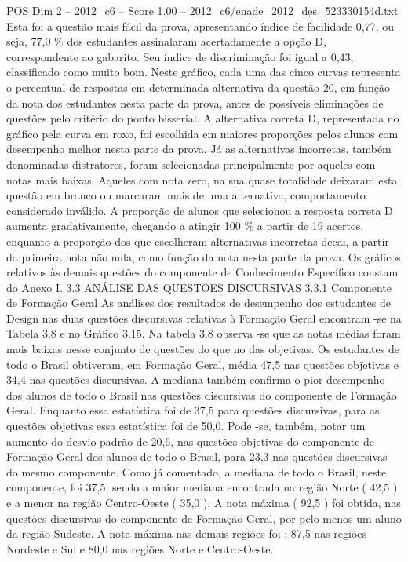 \begin{textsample}{POS Dim 2 – 2012\_c6 – Score 1.00 – 2012\_c6/enade\_2012\_des\_523330154d.txt}
Esta foi a questão mais fácil da prova, apresentando índice de facilidade 0,77, ou seja, 77,0 \% dos estudantes assinalaram acertadamente a opção D, correspondente ao gabarito.
Seu índice de discriminação foi igual a 0,43, classificado como muito bom.
Neste gráfico, cada uma das cinco curvas representa o percentual de respostas em determinada alternativa da questão 20, em função da nota dos estudantes nesta parte da prova, antes de possíveis eliminações de questões pelo critério do ponto bisserial.
A alternativa correta D, representada no gráfico pela curva em roxo, foi escolhida em maiores proporções pelos alunos com desempenho melhor nesta parte da prova.
Já as alternativas incorretas, também denominadas distratores, foram selecionadas principalmente por aqueles com notas mais baixas.
Aqueles com nota zero, na sua quase totalidade deixaram esta questão em branco ou marcaram mais de uma alternativa, comportamento considerado inválido.
A proporção de alunos que selecionou a resposta correta D aumenta gradativamente, chegando a atingir 100 \% a partir de 19 acertos, enquanto a proporção dos que escolheram alternativas incorretas decai, a partir da primeira nota não nula, como função da nota nesta parte da prova.
Os gráficos relativos às demais questões do componente de Conhecimento Específico constam do Anexo I. 3.3 ANÁLISE DAS QUESTÕES DISCURSIVAS 3.3.1 Componente de Formação Geral As análises dos resultados de desempenho dos estudantes de Design nas duas questões discursivas relativas à Formação Geral encontram -se na Tabela 3.8 e no Gráfico 3.15.
Na tabela 3.8 observa -se que as notas médias foram mais baixas nesse conjunto de questões do que no das objetivas.
Os estudantes de todo o Brasil obtiveram, em Formação Geral, média 47,5 nas questões objetivas e 34,4 nas questões discursivas.
A mediana também confirma o pior desempenho dos alunos de todo o Brasil nas questões discursivas do componente de Formação Geral.
Enquanto essa estatística foi de 37,5 para questões discursivas, para as questões objetivas essa estatística foi de 50,0.
Pode -se, também, notar um aumento do desvio padrão de 20,6, nas questões objetivas do componente de Formação Geral dos alunos de todo o Brasil, para 23,3 nas questões discursivas do mesmo componente.
Como já comentado, a mediana de todo o Brasil, neste componente, foi 37,5, sendo a maior mediana encontrada na região Norte ( 42,5 ) e a menor na região Centro-Oeste ( 35,0 ).
A nota máxima ( 92,5 ) foi obtida, nas questões discursivas do componente de Formação Geral, por pelo menos um aluno da região Sudeste.
A nota máxima nas demais regiões foi : 87,5 nas regiões Nordeste e Sul e 80,0 nas regiões Norte e Centro-Oeste.

\end{textsample}
